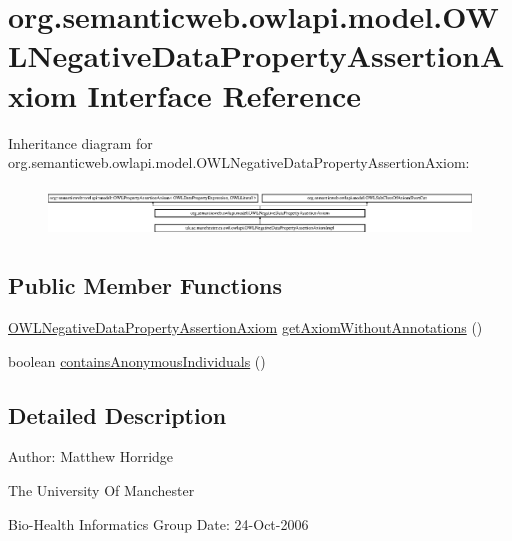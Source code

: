 \hypertarget{interfaceorg_1_1semanticweb_1_1owlapi_1_1model_1_1_o_w_l_negative_data_property_assertion_axiom}{\section{org.\-semanticweb.\-owlapi.\-model.\-O\-W\-L\-Negative\-Data\-Property\-Assertion\-Axiom Interface Reference}
\label{interfaceorg_1_1semanticweb_1_1owlapi_1_1model_1_1_o_w_l_negative_data_property_assertion_axiom}
}
Inheritance diagram for org.\-semanticweb.\-owlapi.\-model.\-O\-W\-L\-Negative\-Data\-Property\-Assertion\-Axiom\-:\begin{figure}[H]
\begin{center}
\leavevmode
\includegraphics[height=1.335453cm]{interfaceorg_1_1semanticweb_1_1owlapi_1_1model_1_1_o_w_l_negative_data_property_assertion_axiom}
\end{center}
\end{figure}
\subsection*{Public Member Functions}
\begin{DoxyCompactItemize}
\item 
\hyperlink{interfaceorg_1_1semanticweb_1_1owlapi_1_1model_1_1_o_w_l_negative_data_property_assertion_axiom}{O\-W\-L\-Negative\-Data\-Property\-Assertion\-Axiom} \hyperlink{interfaceorg_1_1semanticweb_1_1owlapi_1_1model_1_1_o_w_l_negative_data_property_assertion_axiom_a0c3607849029c591cc2b3e77fca2b442}{get\-Axiom\-Without\-Annotations} ()
\item 
boolean \hyperlink{interfaceorg_1_1semanticweb_1_1owlapi_1_1model_1_1_o_w_l_negative_data_property_assertion_axiom_a42eddbeba0e41a1f701c4496fccd3efb}{contains\-Anonymous\-Individuals} ()
\end{DoxyCompactItemize}


\subsection{Detailed Description}
Author\-: Matthew Horridge\par
 The University Of Manchester\par
 Bio-\/\-Health Informatics Group Date\-: 24-\/\-Oct-\/2006 

